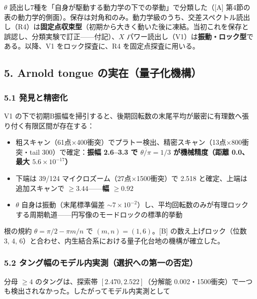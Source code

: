 \documentclass[
  a4paper,
]{ltjsarticle}
\providecommand{\tightlist}{%
  \setlength{\itemsep}{0pt}\setlength{\parskip}{0pt}}
\begin{document}
\(\theta\)
読出し7種を「自身が駆動する動力学の下での挙動」で分類した（{[}A{]}
第4節の表の動力学的側面）。保存は対角和のみ。動力学級のうち、交差スペクトル読出し（R4）は\textbf{固定点収束型}（初期から大きく動いた後に凍結。当初これを保存と誤認し、分類実験で訂正------付記）、\(X\)
パワー読出し（V1）は\textbf{振動・ロック型}である。以降、V1
をロック探査に、R4 を固定点探査に用いる。

\subsection{5. Arnold tongue
の実在（量子化機構）}\label{arnold-tongue-ux306eux5b9fux5728ux91cfux5b50ux5316ux6a5fux69cb}

\subsubsection{5.1
発見と精密化}\label{ux767aux898bux3068ux7cbeux5bc6ux5316}

V1
の下で初期B振幅を掃引すると、後期回転数の末尾平均が厳密に有理数へ張り付く有限区間が存在する：

\begin{itemize}
\tightlist
\item
  粗スキャン（61点×400衝突）でプラトー検出、精密スキャン（13点×800衝突・tail
  300）で確定：\textbf{振幅 2.6--3.3 で \(\overline{\theta/\pi}=1/3\)
  が機械精度（距離 0.0、最大 \(5.6\times10^{-17}\)）}
\item
  下端は 39/124 マイクロズーム（27点×1500衝突）で 2.518
  と確定、上端は追加スキャンで \(\ge3.44\)------\textbf{幅 \(\ge0.92\)}
\item
  \(\theta\) 自身は振動（末尾標準偏差
  \(\sim7\times10^{-2}\)）し、平均回転数のみが有理ロックする周期軌道------円写像のモードロックの標準的挙動
\end{itemize}

根の規約 \(\theta=\pi/2-\pi m/n\) で \((m,n)=(1,6)\)。{[}B{]}
の数え上げロック（位数 3, 4,
6）と合わせ、内生結合系における量子化台地の機構が確立した。

\subsubsection{5.2
タング幅のモデル内実測（選択への第一の否定）}\label{ux30bfux30f3ux30b0ux5e45ux306eux30e2ux30c7ux30ebux5185ux5b9fux6e2cux9078ux629eux3078ux306eux7b2cux4e00ux306eux5426ux5b9a}

分母 \(\ge4\) のタングは、探索帯 \([2.470, 2.522]\)（分解能
0.002・1500衝突）で一つも検出されなかった。したがってモデル内実測として
\end{document}
